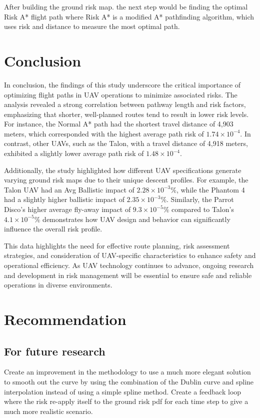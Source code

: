\documentclass[12pt]{report}
\begin{document}
    After building the ground risk map. the next step would be finding the optimal Risk A* flight path where Risk A* is
    a modified A* pathfinding algorithm, which uses risk and distance to measure the most optimal path.

    \section{Conclusion}
    In conclusion, the findings of this study underscore the critical importance of optimizing flight paths in UAV
    operations to minimize associated risks. The analysis revealed a strong correlation between pathway length and risk
    factors, emphasizing that shorter, well-planned routes tend to result in lower risk levels. For instance, the Normal
    A* path had the shortest travel distance of 4,903 meters, which corresponded with the highest average path risk of
    \(1.74 \times 10^{-4}\). In contrast, other UAVs, such as the Talon, with a travel distance of 4,918 meters,
    exhibited a slightly lower average path risk of \(1.48 \times 10^{-4}\).
    
    Additionally, the study highlighted how different UAV specifications generate varying ground risk maps due to their
    unique descent profiles. For example, the Talon UAV had an Avg Ballistic impact of \(2.28 \times 10^{-3}\%\), while
    the Phantom 4 had a slightly higher ballistic impact of \(2.35 \times 10^{-3}\%\). Similarly, the Parrot Disco's
    higher average fly-away impact of \(9.3 \times 10^{-5}\%\) compared to Talon's \(4.1 \times 10^{-5}\%\) demonstrates
    how UAV design and behavior can significantly influence the overall risk profile.
    
    This data highlights the need for effective route planning, risk assessment strategies, and consideration of
    UAV-specific characteristics to enhance safety and operational efficiency. As UAV technology continues to advance,
    ongoing research and development in risk management will be essential to ensure safe and reliable operations in
    diverse environments.


    \section{Recommendation}
        \subsection{For future research}
        Create an improvement in the methodology to use a much more elegant solution to smooth out the curve by using
        the combination of the Dublin curve and spline interpolation instead of using a simple spline method. Create a
        feedback loop where the risk re-apply itself to the ground risk pdf for each time step to give a much more
        realistic scenario.
        
\end{document}
